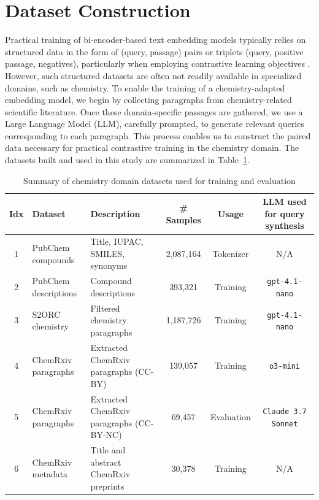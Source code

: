\documentclass[twoside,twocolumn,9pt]{article}
\begin{document}
\section{Dataset Construction}
Practical training of bi-encoder-based text embedding models typically relies on structured data in the form of (query, passage) pairs or triplets (query, positive passage, negatives), particularly when employing contrastive learning objectives \cite{li2023towards,xiao2024c,wang2022text,nussbaum2024nomic}. However, such structured datasets are often not readily available in specialized domains, such as chemistry. To enable the training of a chemistry-adapted embedding model, we begin by collecting paragraphs from chemistry-related scientific literature. Once these domain-specific passages are gathered, we use a Large Language Model (LLM), carefully prompted, to generate relevant queries corresponding to each paragraph. This process enables us to construct the paired data necessary for practical contrastive training in the chemistry domain. The datasets built and used in this study are summarized in Table~\ref{tab:chemistry-datasets}.

\begin{table}[t]
\caption{Summary of chemistry domain datasets used for training and evaluation}
\label{tab:chemistry-datasets}
\centering
\begin{tabular}{c l l c c c}
\toprule
Idx & Dataset              & Description                                                     & \# Samples & Usage & LLM used for query synthesis \\
\midrule
1   & PubChem compounds    & Title, IUPAC, SMILES, synonyms & 2,087,164 & Tokenizer & N/A \\
2   & PubChem descriptions &  Compound descriptions    &   393,321  & Training & \texttt{gpt-4.1-nano} \\
3   & S2ORC chemistry      & Filtered chemistry paragraphs  & 1,187,726  & Training & \texttt{gpt-4.1-nano} \\
4   & ChemRxiv paragraphs       & Extracted ChemRxiv paragraphs (CC-BY)               &   139,057 & Training & \texttt{o3-mini} \\
5   & ChemRxiv paragraphs        & Extracted ChemRxiv paragraphs (CC-BY-NC) &    69,457  & Evaluation & \texttt{Claude 3.7 Sonnet} \\
6   & ChemRxiv metadata    & Title and abstract ChemRxiv preprints           &    30,378 & Training & N/A \\
\bottomrule
\end{tabular}
\end{table}
\end{document}
